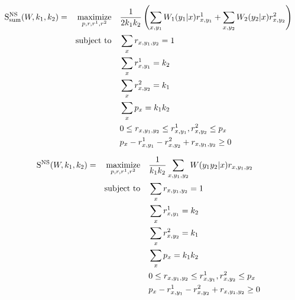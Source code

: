 \begin{proposition}
\begin{equation}
  \begin{aligned}
    \mathrm{S}_{\text{sum}}^{\mathrm{NS}}(W,k_1,k_2) = &&\underset{p,r,r^1,r^2}{\operatorname{\text{maximize}}} &&& \frac{1}{2k_1k_2}\left(\sum_{x,y_1} W_1(y_1|x)r^1_{x,y_1} + \sum_{x,y_2} W_2(y_2|x)r^2_{x,y_2}\right)\\
    &&\operatorname{\text{subject to}} &&& \sum_{x} r_{x,y_1,y_2} = 1\\
    &&&&&\sum_{x} r^1_{x,y_1} = k_2\\
    &&&&& \sum_{x} r^2_{x,y_2} = k_1\\
    &&&&& \sum_{x} p_x = k_1k_2\\
    &&&&& 0 \leq r_{x,y_1,y_2} \leq r^1_{x,y_1}, r^2_{x,y_2} \leq p_x\\
    &&&&& p_x - r^1_{x,y_1} - r^2_{x,y_2} + r_{x,y_1,y_2} \geq 0\\
  \end{aligned}
\end{equation}

\begin{equation}
  \begin{aligned}
    \mathrm{S}^{\mathrm{NS}}(W,k_1,k_2) = &&\underset{p,r,r^1,r^2}{\operatorname{\text{maximize}}} &&& \frac{1}{k_1k_2}\sum_{x,y_1,y_2} W(y_1y_2|x)r_{x,y_1,y_2}\\
    &&\operatorname{\text{subject to}} &&& \sum_{x} r_{x,y_1,y_2} = 1\\
    &&&&&\sum_{x} r^1_{x,y_1} = k_2\\
    &&&&& \sum_{x} r^2_{x,y_2} = k_1\\
    &&&&& \sum_{x} p_x = k_1k_2\\
    &&&&& 0 \leq r_{x,y_1,y_2} \leq r^1_{x,y_1}, r^2_{x,y_2} \leq p_x\\
    &&&&& p_x - r^1_{x,y_1} - r^2_{x,y_2} + r_{x,y_1,y_2} \geq 0\\
  \end{aligned}
\end{equation}
\end{proposition}
